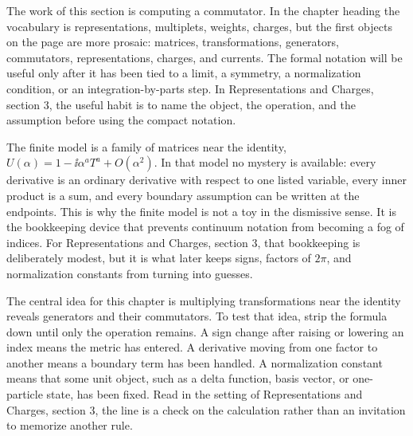 











The work of this section is computing a commutator.  In the chapter heading the vocabulary is representations, multiplets, weights, charges, but the first objects on the page are more prosaic: matrices, transformations, generators, commutators, representations, charges, and currents.  The formal notation will be useful only after it has been tied to a limit, a symmetry, a normalization condition, or an integration-by-parts step.  In Representations and Charges, section 3, the useful habit is to name the object, the operation, and the assumption before using the compact notation.

The finite model is a family of matrices near the identity, \(U(\alpha)=1-\ii\alpha^aT^a+O(\alpha^2)\).  In that model no mystery is available: every derivative is an ordinary derivative with respect to one listed variable, every inner product is a sum, and every boundary assumption can be written at the endpoints.  This is why the finite model is not a toy in the dismissive sense.  It is the bookkeeping device that prevents continuum notation from becoming a fog of indices.  For Representations and Charges, section 3, that bookkeeping is deliberately modest, but it is what later keeps signs, factors of \(2\pi\), and normalization constants from turning into guesses.

The central idea for this chapter is multiplying transformations near the identity reveals generators and their commutators.  To test that idea, strip the formula down until only the operation remains.  A sign change after raising or lowering an index means the metric has entered.  A derivative moving from one factor to another means a boundary term has been handled.  A normalization constant means that some unit object, such as a delta function, basis vector, or one-particle state, has been fixed.  Read in the setting of Representations and Charges, section 3, the line is a check on the calculation rather than an invitation to memorize another rule.

